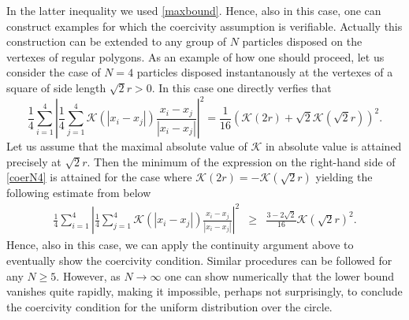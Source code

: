 In the latter inequality we used \eqref{maxbound}. Hence, also in this case, one can construct examples for which the coercivity assumption is verifiable. Actually this construction can be extended to any group of $N$ particles disposed on the vertexes of regular polygons. As an example of how one should proceed, let us consider the case of $N=4$ particles disposed instantanously at the vertexes of a square of side length $\sqrt{2} r>0$. In this case one directly verfies that
\begin{equation}\label{coerN4}
\frac{1}{4} \sum_{i=1}^4 \left | \frac{1}{4} \sum_{j=1}^4 \mathcal K(|x_i-x_j|) \frac{x_i-x_j}{|x_i-x_j|} \right |^2 = \frac{1}{16} ( \mathcal K(2 r) +  \sqrt 2 \mathcal K(\sqrt 2 r) )^2.
\end{equation}
Let us assume that the maximal absolute value of $\mathcal K$ in absolute value is attained precisely at $\sqrt 2 r$. Then the minimum of the expression on the right-hand side of \eqref{coerN4} is attained for
the case where $\mathcal K(2 r)  = -  \mathcal K(\sqrt 2 r)$ yielding the following estimate from below
\begin{eqnarray*}
\frac{1}{4} \sum_{i=1}^4 \left | \frac{1}{4} \sum_{j=1}^4 \mathcal K(|x_i-x_j|) \frac{x_i-x_j}{|x_i-x_j|} \right |^2  &\geq& \frac{3 -2 \sqrt 2}{16} \mathcal K(\sqrt 2 r)^2.
\end{eqnarray*}
Hence, also in this case, we can apply the continuity argument above to eventually show the coercivity condition. Similar procedures can be followed for any $N \geq 5$. However, as $N \to \infty$ one can show numerically that the lower bound vanishes quite rapidly, making it impossible, perhaps not surprisingly, to conclude the coercivity condition for the uniform distribution over the circle.
\\

